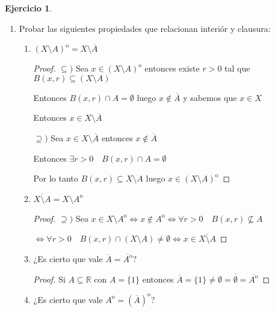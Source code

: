 \documentclass[12pt]{article}
\newcommand{\R}{\mathbb{R}}
\newcommand{\N}{\mathbb{N}}
\newcommand{\ra}{\rightarrow}
\newcommand{\ol}{\overline}
\newcommand{\open}{\mathrm{o}}
\theoremstyle{definition}
\newtheorem{ej}{Ejercicio}
\begin{document}
\begin{ej}
\begin{enumerate}
\begin{enumerate}
\begin{proof}
	$\Leftarrow ) $ Sea $a_{n} \in A \quad \forall n \in \N$ tal que $a_{n} \ra x $

	Entonces $\forall \epsilon > 0 \quad \exists a_{n} \in A $ tal que $d(x,a_{n}) \leq \epsilon$

	Luego $\forall \epsilon > 0$ tenemos $a_{n} \in B(x, \epsilon)$ con $a_{n} \in A$

      Por lo que $B(x,\epsilon) \cap A \neq \emptyset$

      Entonces $x \in \ol A$
	\end{proof}
      \end{enumerate}

    \item Probar las siguientes propiedades que relacionan interiór y clausura:
      \begin{enumerate}
	\item $(X \setminus A)^{\open} = X \setminus \ol A$
	  \begin{proof}
	  $\subseteq ) $ Sea $x \in (X\setminus A)^{\open}$ entonces existe $r>0$ tal que $B(x,r) \subseteq (X \setminus A)$

	    Entonces $B(x,r) \cap A = \emptyset$ luego $x \notin \ol A$ y sabemos que $x \in X$

	    Entonces $x \in X \setminus \ol A$

	  $\supseteq )$ Sea $x \in X \setminus \ol A$ entonces $x \notin \ol A$

	  Entonces $\exists r>0 \quad B(x,r) \cap A = \emptyset$

	Por lo tanto $B(x,r) \subseteq X \setminus A$ luego $x \in (X \setminus A)^{\open}$
	  \end{proof}
	\item $\ol{X \setminus A} = X \setminus A^{\open}$
	  \begin{proof}
	  $\supseteq )$ Sea $x \in X\setminus A^{\open} \iff x \notin A^{\open} \iff \forall r > 0 \quad B(x,r) \not\subseteq A$ 

	  $\iff \forall r>0 \quad B(x,r) \cap (X\setminus A) \neq \emptyset \iff x \in \ol{X \setminus A}$
	  \end{proof}
	\item ¿Es cierto que vale $\ol A = \ol{A^{\open}}$?
	  \begin{proof}
	    Si $A \subseteq \R$ con $A = \{1\}$ entonces $\ol A = \{1\} \neq \emptyset = \ol{\emptyset} = \ol{A^{\open}}$
	  \end{proof}
	\item ¿Es cierto que vale $A^{\open} = (\ol A)^{\open}$? 
	  

\end{enumerate}
\end{enumerate}
\end{ej}
\end{document}

